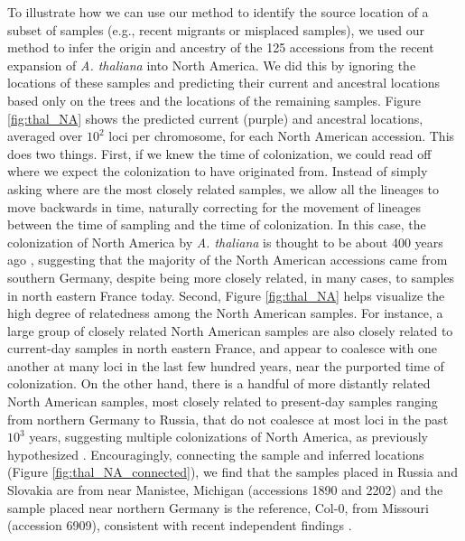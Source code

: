 \documentclass[12pt]{article}
\begin{document}
To illustrate how we can use our method to identify the source location of a subset of samples (e.g., recent migrants or misplaced samples), we used our method to infer the origin and ancestry of the 125 accessions from the recent expansion of \textit{A. thaliana} into North America.
We did this by ignoring the locations of these samples and predicting their current and ancestral locations based only on the trees and the locations of the remaining samples. 
Figure \ref{fig:thal_NA} shows the predicted current (purple) and ancestral locations, averaged over $10^2$ loci per chromosome, for each North American accession.
This does two things. 
First, if we knew the time of colonization, we could read off where we expect the colonization to have originated from.
Instead of simply asking where are the most closely related samples, we allow all the lineages to move backwards in time, naturally correcting for the movement of lineages between the time of sampling and the time of colonization.
In this case, the colonization of North America by \textit{A. thaliana} is thought to be about 400 years ago \citep{exposito2018rate}, suggesting that the majority of the North American accessions came from southern Germany, despite being more closely related, in many cases, to samples in north eastern France today.
Second, Figure \ref{fig:thal_NA} helps visualize the high degree of relatedness among the North American samples. 
For instance, a large group of closely related North American samples are also closely related to current-day samples in north eastern France, and appear to coalesce with one another at many loci in the last few hundred years, near the purported time of colonization.
On the other hand, there is a handful of more distantly related North American samples, most closely related to present-day samples ranging from northern Germany to Russia, that do not coalesce at most loci in the past $10^3$ years, suggesting multiple colonizations of North America, as previously hypothesized \citep{exposito2018rate}.
Encouragingly, connecting the sample and inferred locations (Figure \ref{fig:thal_NA_connected}), we find that the samples placed in Russia and Slovakia are from near Manistee, Michigan (accessions 1890 and 2202) and the sample placed near northern Germany is the reference, Col-0, from Missouri (accession 6909), consistent with recent independent findings \citep{shirsekar2021fine}.

\end{document}
